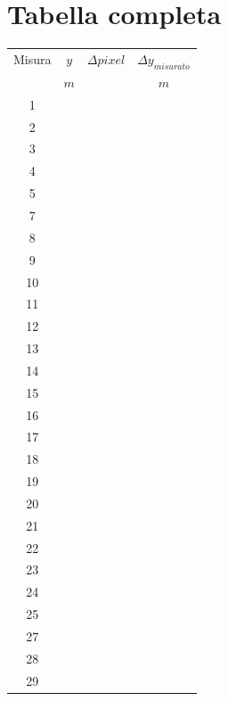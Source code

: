 \documentclass[12pt, a4paper]{article}
\begin{document}
\newpage

\section{Tabella completa}
\begin{table}[h!]
    \centering
    \begin{tabular}{|c|c|c|c|}
    \hline
         \footnotesize Misura & $y$ &$\Delta pixel$& $\Delta y_{misurato}$ \\
         \footnotesize  & $m$ & &  $m$\\
    \hline
         \footnotesize 1 & & & \\
         \footnotesize 2 & & & \\
         \footnotesize 3 & & & \\
         \footnotesize 4 & & & \\
         \footnotesize 5 & & & \\
         \footnotesize 7 & & & \\
         \footnotesize 8 & & & \\
         \footnotesize 9 & & & \\
         \footnotesize 10 & & & \\
         \footnotesize 11 & & & \\
         \footnotesize 12 & & & \\ 
         \footnotesize 13 & & & \\
         \footnotesize 14 & & & \\
         \footnotesize 15 & & & \\
         \footnotesize 16 & & & \\
         \footnotesize 17 & & & \\
         \footnotesize 18 & & & \\
         \footnotesize 19 & & & \\
         \footnotesize 20 & & & \\
         \footnotesize 21 & & & \\
         \footnotesize 22 & & & \\
         \footnotesize 23 & & & \\
         \footnotesize 24 & & & \\
         \footnotesize 25 & & & \\
         \footnotesize 27 & & & \\
         \footnotesize 28 & & & \\
         \footnotesize 29 & & & \\

\end{tabular}
\end{table}
\end{document}
